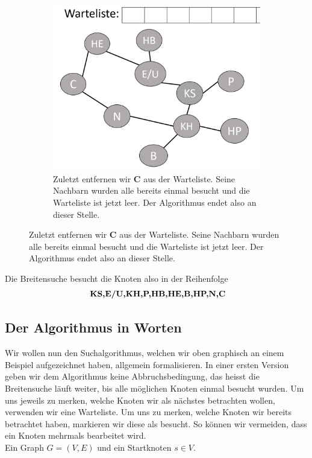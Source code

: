 \begin{figure}[H]\ContinuedFloat
     \centering
     \begin{subfigure}[h]{0.45\textwidth}
    \centering
    \includegraphics[width=\textwidth]{Pictures/BS/BFSB10.PNG}
    \caption{Zuletzt entfernen wir {\bf{C}} aus der Warteliste. Seine Nachbarn wurden alle bereits einmal besucht und die Warteliste ist jetzt leer. Der Algorithmus endet also an dieser Stelle.}
    \end{subfigure}
\end{figure}
Die Breitensuche besucht die Knoten also in der Reihenfolge 
$$ \text{ \bf{KS,E/U,KH,P,HB,HE,B,HP,N,C}} $$

\subsection{Der Algorithmus in Worten}
Wir wollen nun den Suchalgorithmus, welchen wir oben graphisch an einem Beispiel aufgezeichnet haben, allgemein formalisieren. In einer ersten Version geben wir dem Algorithmus keine Abbruchsbedingung, das heisst die Breitensuche läuft weiter, bis alle möglichen Knoten einmal besucht wurden. Um uns jeweils zu merken, welche Knoten wir als nächstes betrachten wollen, verwenden wir eine Warteliste. Um uns zu merken, welche Knoten wir bereits betrachtet haben, markieren wir diese als besucht. So können wir vermeiden, dass ein Knoten mehrmals bearbeitet wird.\\

  Ein Graph $G=(V,E)$ und ein Startknoten $s \in V$.


